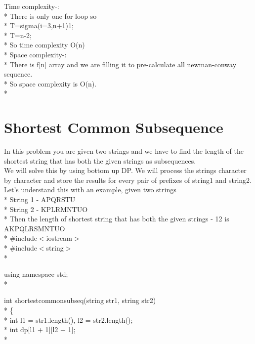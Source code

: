 \documentclass[12pt]{book}
\begin{document}
Time complexity-:\\*
There is only one for loop so \\*
T=sigma(i=3,n+1)1;\\*
T=n-2; \\*
So time complexity O(n)\\*
\newline
\newline
Space complexity-:\\*
There is f[n] array and we are filling it to pre-calculate all newman-conway sequence.\\*
So space complexity is O(n). \\*

\chapter{ Shortest Common Subsequence}
In this problem you are given two strings and we have to find the length of the shortest string that has both the given strings as subsequences.\\
\newline
We will solve this by using bottom up DP. We will process the strings character by character and store the results for every pair of prefixes of string1 and string2.\\
\newline Let’s understand this with an example, given two strings\\*
String 1 - APQRSTU \\*
String 2 - KPLRMNTUO \\*
Then the length of shortest string that has both the given strings  - 12 is AKPQLRSMNTUO\\*
$\#$include$<$iostream$>$ \\*
$\#$include$<$string$>$\\*

using namespace std;\\*

int shortestcommonsubseq(string str1, string str2)\\*
\{ \\*
\phantom{x} \hspace{3ex}    int l1 = str1.length(), l2 = str2.length();\\*
\phantom{x} \hspace{3ex}    int dp[l1 + 1][l2 + 1];\\*
    
\end{document}
